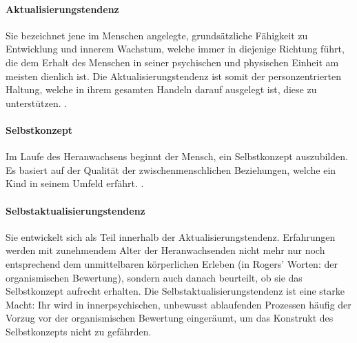 \documentclass[
  twoside,
  parskip=half-,
]{scrreprt}
\begin{document}
\paragraph{Aktualisierungstendenz} Sie bezeichnet jene im Menschen angelegte, grundsätzliche Fähigkeit zu Entwicklung und innerem Wachstum, welche immer in diejenige Richtung führt, die dem Erhalt des Menschen in seiner psychischen und physischen Einheit am meisten dienlich ist. Die Aktualisierungstendenz ist somit  der personzentrierten Haltung, welche in ihrem gesamten Handeln darauf ausgelegt ist, diese   zu unterstützen. .

\paragraph{Selbstkonzept} Im Laufe des Heranwachsens beginnt der Mensch, ein Selbstkonzept auszubilden. Es basiert auf der Qualität der zwischenmenschlichen Beziehungen, welche ein Kind in seinem Umfeld erfährt. . 

\paragraph{Selbstaktualisierungstendenz} Sie entwickelt sich als Teil innerhalb der Aktualisierungstendenz. Erfahrungen werden mit zunehmendem Alter der Heranwachsenden nicht mehr nur noch entsprechend dem unmittelbaren körperlichen Erleben (in Rogers' Worten: der organismischen Bewertung), sondern auch danach beurteilt, ob sie das Selbstkonzept aufrecht erhalten. Die Selbstaktualisierungstendenz ist eine starke Macht: Ihr wird in innerpsychischen, unbewusst ablaufenden Prozessen häufig der Vorzug vor der organismischen Bewertung eingeräumt, um das Konstrukt des Selbstkonzepts nicht zu gefährden. 
\end{document}
